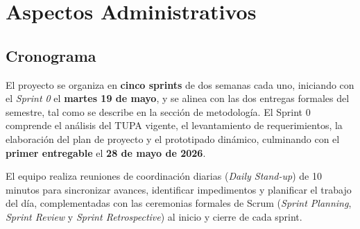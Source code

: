 \section{Aspectos Administrativos}

\subsection{Cronograma}

El proyecto se organiza en \textbf{cinco sprints} de dos semanas cada uno,
iniciando con el \textit{Sprint 0} el \textbf{martes 19 de mayo}, y se alinea con
las dos entregas formales del semestre, tal como se describe en la sección de
metodología. El Sprint 0 comprende el análisis del TUPA vigente, el levantamiento
de requerimientos, la elaboración del plan de proyecto y el prototipado dinámico,
culminando con el \textbf{primer entregable} el \textbf{28 de mayo de 2026}.

El equipo realiza reuniones de coordinación diarias (\textit{Daily Stand-up}) de
10 minutos para sincronizar avances, identificar impedimentos y planificar el
trabajo del día, complementadas con las ceremonias formales de Scrum (\textit{Sprint
Planning}, \textit{Sprint Review} y \textit{Sprint Retrospective}) al inicio y
cierre de cada sprint.

